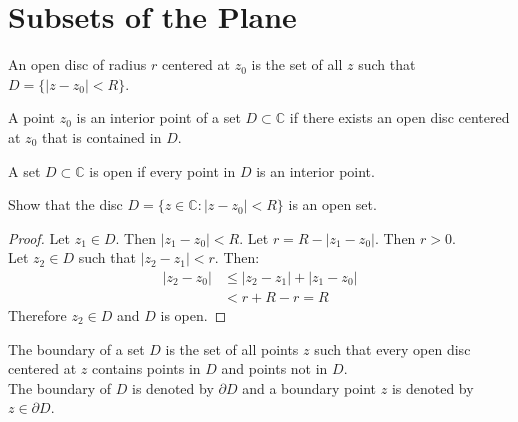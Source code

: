 \section{Subsets of the Plane}
\begin{definition}
    An open disc of radius $r$ centered at $z_0$ is the set of all $z$ such that $D = \{|z - z_0| < R\}$.
\end{definition}
\begin{definition}
    A point $z_0$ is an interior point of a set $D \subset \mathbb{C}$ if there exists an open disc centered at $z_0$ that is contained in $D$.
\end{definition}

\begin{definition}
    A set $D \subset \mathbb{C}$ is open if every point in $D$ is an interior point.
\end{definition}

\begin{example}
    Show that the disc $D = \{z \in \mathbb{C} : |z - z_0| < R\}$ is an open set.
    \begin{proof}
        Let $z_1 \in D$. Then $|z_1 - z_0| < R$. Let $r = R - |z_1 - z_0|$. Then $r > 0$. \\
        Let $z_2 \in D$ such that $|z_2 - z_1| < r$. Then:
        \begin{align*}
            |z_2 - z_0| & \leq |z_2 - z_1| + |z_1 - z_0| \\
                        & < r + R - r = R
        \end{align*}
        Therefore $z_2 \in D$ and $D$ is open.
    \end{proof}
\end{example}

\begin{definition}
    The boundary of a set $D$ is the set of all points $z$ such that every open disc centered at $z$ contains points in $D$ and points not in $D$. \\
    The boundary of $D$ is denoted by $\partial D$ and a boundary point $z$ is denoted by $z \in \partial D$.
\end{definition}

